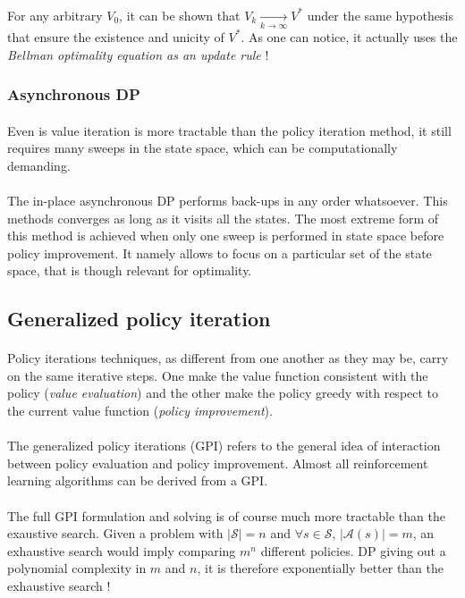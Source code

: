 \documentclass[a4paper]{article}
\begin{document}
{{{				\paragraph{} For any arbitrary $V_0$, it can be shown that $V_k\underset{k\to\infty}{\longrightarrow}V^*$ under the same hypothesis that ensure the existence and unicity of $V^*$. As one can notice, it actually uses the \emph{Bellman optimality equation as an update rule} !
			}
			\subsubsection{Asynchronous DP}
			{
				\paragraph{} Even is value iteration is more tractable than the policy iteration method, it still requires many sweeps in the state space, which can be computationally demanding.
				\paragraph{} The in-place asynchronous DP performs back-ups in any order whatsoever. This methods converges as long as it visits all the states. The most extreme form of this method is achieved when only one sweep is performed in state space before policy improvement. It namely allows to focus on a particular set of the state space, that is though relevant for optimality. 
			}
		}
		
		\subsection{Generalized policy iteration}
		{
			\paragraph{} Policy iterations techniques, as different from one another as they may be, carry on the same iterative steps. One make the value function consistent with the policy (\emph{value evaluation}) and the other make the policy greedy with respect to the current value function (\emph{policy improvement}). 
			
			\paragraph{} The generalized policy iterations (GPI) refers to the general idea of interaction between policy evaluation and policy improvement. Almost all reinforcement learning algorithms can be derived from a GPI. 
			\paragraph{} The full GPI formulation and solving is of course much more tractable than the exaustive search. Given a problem with $\vert \mathcal{S} \vert = n$ and $\forall{s}\in\mathcal{S}, \, \vert \mathcal{A}(s) \vert = m$, an exhaustive search would imply comparing $m^n$ different policies. DP giving out a polynomial complexity in $m$ and $n$, it is therefore exponentially better than the exhaustive search ! 
		}
	}
	\newpage
	
\end{document}

